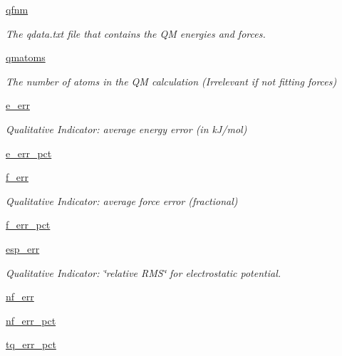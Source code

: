 \begin{DoxyCompactItemize}
\hyperlink{classforcebalance_1_1abinitio_1_1AbInitio_ac93db408472034937e79572bf872886c}{qfnm}
\begin{DoxyCompactList}\small\item\em The qdata.\-txt file that contains the Q\-M energies and forces. \end{DoxyCompactList}\item 
\hyperlink{classforcebalance_1_1abinitio_1_1AbInitio_af0760b8d33ce9dd044ccbe68fba7a1be}{qmatoms}
\begin{DoxyCompactList}\small\item\em The number of atoms in the Q\-M calculation (Irrelevant if not fitting forces) \end{DoxyCompactList}\item 
\hyperlink{classforcebalance_1_1abinitio_1_1AbInitio_aa569290969858e189935b3de37ead3f0}{e\-\_\-err}
\begin{DoxyCompactList}\small\item\em Qualitative Indicator\-: average energy error (in k\-J/mol) \end{DoxyCompactList}\item 
\hyperlink{classforcebalance_1_1abinitio_1_1AbInitio_a4e3e525a03ab55bc004ebf0e3a0d60ce}{e\-\_\-err\-\_\-pct}
\item 
\hyperlink{classforcebalance_1_1abinitio_1_1AbInitio_a176fb2b013ecc5ab451fd3b190414c4d}{f\-\_\-err}
\begin{DoxyCompactList}\small\item\em Qualitative Indicator\-: average force error (fractional) \end{DoxyCompactList}\item 
\hyperlink{classforcebalance_1_1abinitio_1_1AbInitio_ab6ee932ad4689f538c746310939dd0bc}{f\-\_\-err\-\_\-pct}
\item 
\hyperlink{classforcebalance_1_1abinitio_1_1AbInitio_abdc625c3149cee375b56b4e0d73034fe}{esp\-\_\-err}
\begin{DoxyCompactList}\small\item\em Qualitative Indicator\-: \char`\"{}relative R\-M\-S\char`\"{} for electrostatic potential. \end{DoxyCompactList}\item 
\hyperlink{classforcebalance_1_1abinitio_1_1AbInitio_a89de620e9aa500481c9e1ded99e14f72}{nf\-\_\-err}
\item 
\hyperlink{classforcebalance_1_1abinitio_1_1AbInitio_a184edac2cb27a999c363595ea59d8163}{nf\-\_\-err\-\_\-pct}
\item 
\hyperlink{classforcebalance_1_1abinitio_1_1AbInitio_a184f2a783b2710f6f75842afdeccf14e}{tq\-\_\-err\-\_\-pct}

\end{DoxyCompactItemize}
